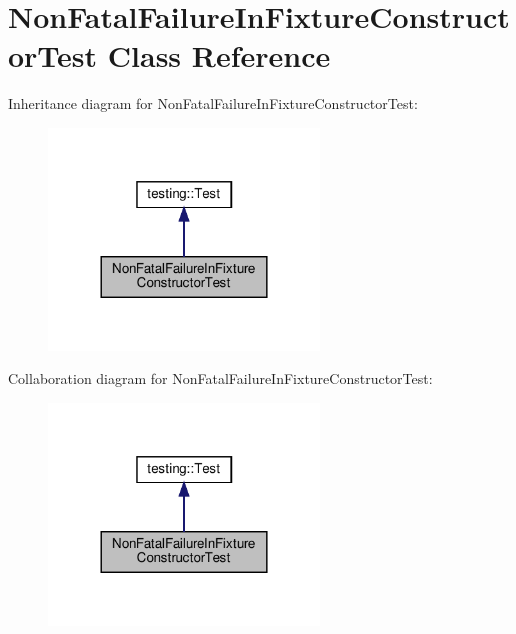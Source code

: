 \hypertarget{class_non_fatal_failure_in_fixture_constructor_test}{}\section{Non\+Fatal\+Failure\+In\+Fixture\+Constructor\+Test Class Reference}
\label{class_non_fatal_failure_in_fixture_constructor_test}


Inheritance diagram for Non\+Fatal\+Failure\+In\+Fixture\+Constructor\+Test\+:
\nopagebreak
\begin{figure}[H]
\begin{center}
\leavevmode
\includegraphics[width=204pt]{class_non_fatal_failure_in_fixture_constructor_test__inherit__graph}
\end{center}
\end{figure}


Collaboration diagram for Non\+Fatal\+Failure\+In\+Fixture\+Constructor\+Test\+:
\nopagebreak
\begin{figure}[H]
\begin{center}
\leavevmode
\includegraphics[width=204pt]{class_non_fatal_failure_in_fixture_constructor_test__coll__graph}
\end{center}
\end{figure}
